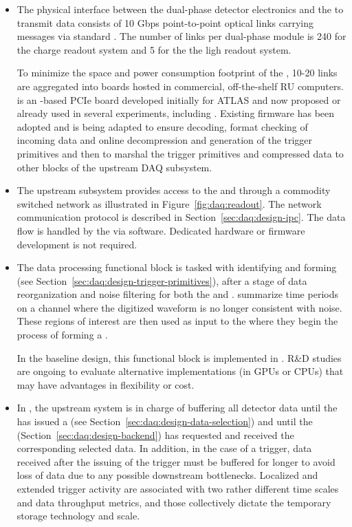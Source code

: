 \begin{itemize}

  \item The physical interface between the dual-phase detector electronics and the  to
transmit data consists of 10 Gbps point-to-point optical links
carrying messages via standard .
The number of links per dual-phase   module is 240 for the charge readout system and 5 for the
the ligh readout system.

To minimize the space and power consumption footprint of the , 10-20
links are aggregated into  boards hosted in commercial,
off-the-shelf RU computers.
 is an -based PCIe board developed initially for ATLAS
and now proposed or already used in several experiments, including
. 
Existing firmware has been adopted and is being adapted to ensure
decoding, format checking of incoming data and online decompression and generation of the trigger primitives
and then to marshal the trigger primitives and compressed data to other blocks of
the upstream DAQ subsystem.

 \item The upstream  subsystem provides access to the
 and  through a commodity switched network as
illustrated in Figure~\ref{fig:daq:readout}. The network communication
protocol is described in Section~\ref{sec:daq:design-ipc}. The data flow
is handled by the  via software. Dedicated hardware or firmware
development is not required.

\item The data processing functional block is tasked with identifying and forming  (see
Section~\ref{sec:daq:design-trigger-primitives}), after a stage of data
reorganization and noise filtering for both the  and .  summarize time periods on a channel where the digitized waveform is no longer consistent with noise.
These regions of interest are then used as input to the  where they begin the process of forming a .

In the baseline design, this functional block is implemented in .
R\&D studies are ongoing to evaluate alternative implementations (in GPUs or CPUs) that may have advantages in flexibility or cost.

\item In , the upstream  system is in charge of buffering all
detector data until the  has issued a 
(see Section~\ref{sec:daq:design-data-selection}) and until the
 (Section~\ref{sec:daq:design-backend}) has requested
and received the corresponding selected data. 
In addition, in the case of a  trigger, data received after
the issuing of the trigger must be buffered for longer to
avoid loss of data due to any possible downstream
bottlenecks. Localized and extended trigger activity are associated
with two rather different time scales and data throughput metrics, and
those collectively dictate the temporary storage technology and scale. 


\end{itemize}
